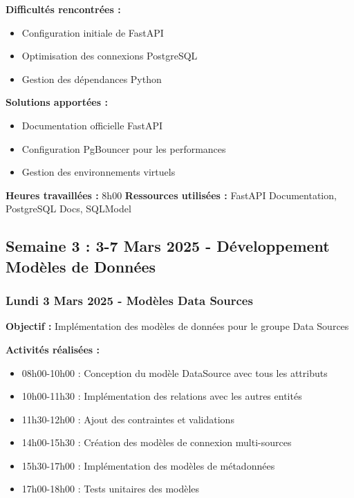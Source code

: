 \textbf{Difficultés rencontrées :}
\begin{itemize}
    \item Configuration initiale de FastAPI
    \item Optimisation des connexions PostgreSQL
    \item Gestion des dépendances Python
\end{itemize}

\textbf{Solutions apportées :}
\begin{itemize}
    \item Documentation officielle FastAPI
    \item Configuration PgBouncer pour les performances
    \item Gestion des environnements virtuels
\end{itemize}

\textbf{Heures travaillées :} 8h00
\textbf{Ressources utilisées :} FastAPI Documentation, PostgreSQL Docs, SQLModel


\subsection{Semaine 3 : 3-7 Mars 2025 - Développement Modèles de Données}

\subsubsection{Lundi 3 Mars 2025 - Modèles Data Sources}
\textbf{Objectif :} Implémentation des modèles de données pour le groupe Data Sources

\textbf{Activités réalisées :}
\begin{itemize}
    \item 08h00-10h00 : Conception du modèle DataSource avec tous les attributs
    \item 10h00-11h30 : Implémentation des relations avec les autres entités
    \item 11h30-12h00 : Ajout des contraintes et validations
    \item 14h00-15h30 : Création des modèles de connexion multi-sources
    \item 15h30-17h00 : Implémentation des modèles de métadonnées
    \item 17h00-18h00 : Tests unitaires des modèles
\end{itemize}

